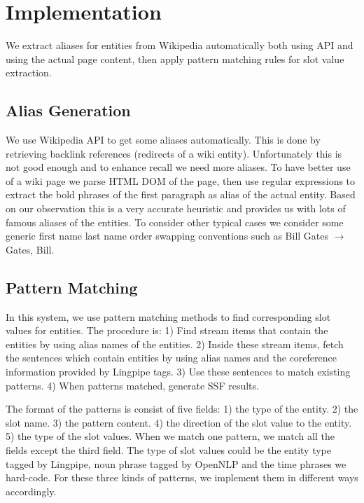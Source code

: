 

\section{Implementation}

We extract aliases for entities from Wikipedia automatically both using API 
and using the actual page content, then apply pattern matching rules for slot 
value extraction. 

\subsection{Alias Generation}

We use Wikipedia API to get some aliases automatically. This is done by 
retrieving backlink references (redirects of a wiki entity). Unfortunately 
this is not good enough and to enhance recall we need more aliases. To have 
better use of a wiki page we parse HTML DOM of the page, then use regular 
expressions to extract the bold phrases of the first paragraph as alias of the 
actual entity. Based on our observation this is a very accurate heuristic and 
provides us with lots of famous aliases of the entities. To consider other 
typical cases we consider some generic first name last name order swapping 
conventions such as Bill Gates $\rightarrow$ Gates, Bill.  

\subsection{Pattern Matching}

In this system, we use pattern matching methods to find corresponding slot 
values for entities. The procedure is: 1) Find stream items that contain the 
entities by using alias names of the entities. 2) Inside these stream items, 
fetch the sentences which contain entities by using alias names and the 
coreference information provided by Lingpipe tags. 3) Use these sentences to 
match existing patterns. 4) When patterns matched, generate SSF results.

The format of the patterns is consist of five fields:
1) the type of the entity. 
2) the slot name.
3) the pattern content.
4) the direction of the slot value to the entity.
5) the type of the slot values. When we match one pattern, we match all the 
fields except the third field. The type of slot values could be the entity 
type tagged by Lingpipe, noun phrase tagged by OpenNLP and the time phrases we 
hard-code. For these three kinds of patterns, we implement them in different 
ways accordingly. 


